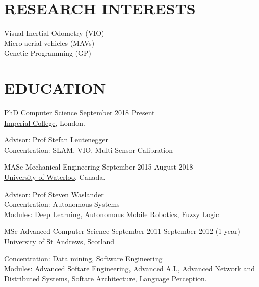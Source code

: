 \documentclass[line,margin]{cv}
\begin{document}

\address{Email: \href{mailto:chutsu@gmail.com}{chutsu@gmail.com}}
\address{ebsite: \href{http://chutsu.github.io}{http://chutsu.github.io}}


\begin{resume}

\section{RESEARCH INTERESTS}
Visual Inertial Odometry (VIO) \\
Micro-aerial vehicles (MAVs) \\
Genetic Programming (GP)



\section{EDUCATION}
PhD Computer Science
\hfill September 2018 \textemdash{} Present \\
\href{http://www.imperial.ac.uk}{Imperial College}, London.

\vspace{0.1em}
\begin{adjustwidth}{2.0em}{2.0em}
	Advisor: Prof Stefan Leutenegger \\
	Concentration: SLAM, VIO, Multi-Sensor Calibration
\end{adjustwidth}


MASc Mechanical Engineering
\hfill September 2015 \textemdash{} August 2018 \\
\href{http://www.uwaterloo.ca}{University of Waterloo}, Canada.

\vspace{0.1em}
\begin{adjustwidth}{2.0em}{2.0em}
	Advisor: Prof Steven Waslander \\
	Concentration: Autonomous Systems \\
	Modules: Deep Learning, Autonomous Mobile Robotics, Fuzzy Logic
\end{adjustwidth}


MSc Advanced Computer Science
\hfill September 2011 \textemdash{} September 2012 (1 year) \\
\href{http://www.st-andrews.ac.uk}{University of St Andrews}, Scotland

\vspace{0.1em}
\begin{adjustwidth}{2.0em}{2.0em}
	Concentration: Data mining, Software Engineering \\
	Modules: Advanced Softare Engineering, Advanced A.I., Advanced Network 
	and Distributed Systems, Softare Architecture, Language Perception.
\end{adjustwidth}



\end{resume}
\end{document}
